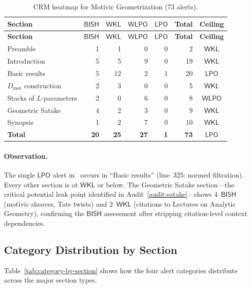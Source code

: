 \documentclass[11pt,a4paper]{article}
\theoremstyle{plain}
\theoremstyle{definition}
\newcommand{\BISH}{\textsf{BISH}}
\newcommand{\WKL}{\textsf{WKL}}
\newcommand{\WLPO}{\textsf{WLPO}}
\newcommand{\LPO}{\textsf{LPO}}
\newcommand{\Dmot}{D_{\mathrm{mot}}}
\begin{document}
{\small
\begin{longtable}{@{}p{4.0cm}rrrrrc@{}}
\caption{CRM heatmap for Motivic Geometrization (73 alerts).}
\label{tab:motivic-heatmap} \\
\toprule
\textbf{Section} & \textbf{$\BISH$} & \textbf{$\WKL$} & \textbf{$\WLPO$} & \textbf{$\LPO$} & \textbf{Total} & \textbf{Ceiling} \\
\midrule
\endfirsthead
\toprule
\textbf{Section} & \textbf{$\BISH$} & \textbf{$\WKL$} & \textbf{$\WLPO$} & \textbf{$\LPO$} & \textbf{Total} & \textbf{Ceiling} \\
\midrule
\endhead
\bottomrule
\endlastfoot
%
Preamble                  &  1 &  1 &  0 & 0 &  2 & $\WKL$  \\
Introduction              &  5 &  5 &  9 & 0 & 19 & $\WKL$  \\
Basic results             &  5 & 12 &  2 & 1 & 20 & $\LPO$  \\
$\Dmot$ construction      &  2 &  3 &  0 & 0 &  5 & $\WKL$  \\
Stacks of $L$-parameters  &  2 &  0 &  6 & 0 &  8 & $\WLPO$ \\
Geometric Satake          &  4 &  2 &  3 & 0 &  9 & $\WKL$  \\
Synopsis                  &  1 &  2 &  7 & 0 & 10 & $\WKL$  \\
\midrule
\textbf{Total}            & \textbf{20} & \textbf{25} & \textbf{27} & \textbf{1} & \textbf{73} & $\LPO$ \\
\end{longtable}
}

\paragraph{Observation.}
The single $\LPO$ alert in~\cite{scholze-motivic-geometrization} occurs in ``Basic results'' (line~325: normed filtration).  Every other section is at $\WKL$ or below.  The Geometric Satake section---the critical potential leak point identified in Audit~\ref{audit:satake}---shows 4~$\BISH$ (motivic sheaves, Tate twists) and 2~$\WKL$ (citations to Lectures on Analytic Geometry), confirming the $\BISH$ assessment after stripping citation-level context dependencies.

\subsection{Category Distribution by Section}

Table~\ref{tab:category-by-section} shows how the four alert categories distribute across the major section types.
\end{document}
